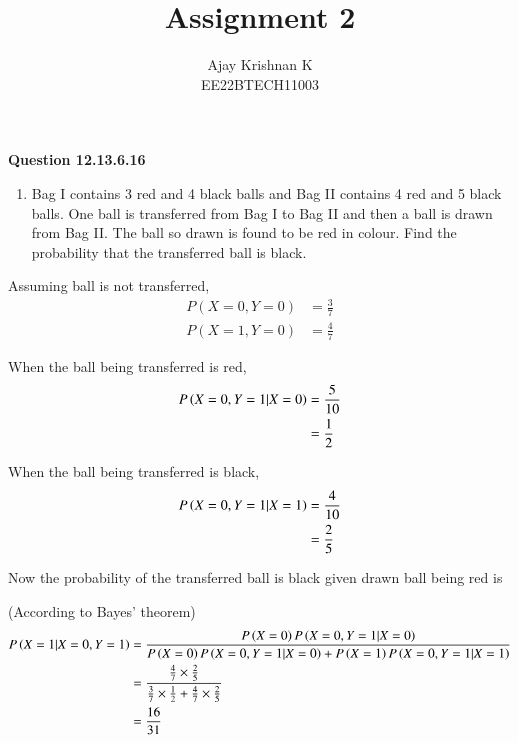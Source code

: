 \documentclass[journal,11pt,onecolumn]{IEEEtran}
\begin{document}
\vspace{3cm}
\author{Ajay Krishnan K\\EE22BTECH11003}

\title{Assignment 2}
\maketitle

\textbf{Question 12.13.6.16}
\begin{enumerate}
    \item Bag I contains 3 red and 4 black balls and Bag II contains 4 red and 5 black balls.
          One ball is transferred from Bag I to Bag II and then a ball is drawn from Bag II.
          The ball so drawn is found to be red in colour. Find the probability that the
          transferred ball is black.
\end{enumerate}

\solution


Assuming ball is not transferred,
\begin{align}
    P(X=0, Y=0) & = \frac{3}{7} \\
    P(X=1, Y=0) & = \frac{4}{7}
\end{align}

When the ball being transferred is red,
\begin{align}
    P\left(X=0,Y=1\middle|X=0\right) & = \frac{5}{10} \\
                                & =\frac{1}{2}
\end{align}

When the ball being transferred is black,
\begin{align}
    P\left(X=0,Y=1\middle|X=1\right) & = \frac{4}{10} \\
                                & =\frac{2}{5}
\end{align}

Now the probability of the transferred ball is black given drawn ball being red is

(According to Bayes' theorem)
\begin{align}
    P\left(X=1\middle|X=0,Y=1\right)
     & = \frac{P\left(X=0\right)P\left(X=0,Y=1\middle|X=0\right)}{P\left(X=0\right)P\left(X=0,Y=1\middle|X=0\right) + P\left(X=1\right)P\left(X=0,Y=1\middle|X=1\right)} \\
     & = \frac{\frac{4}{7} \times \frac{2}{5}}{\frac{3}{7}\times\frac{1}{2}+\frac{4}{7}\times\frac{2}{5}}                   \\
     & = \frac{16}{31}
\end{align}
\end{document}

